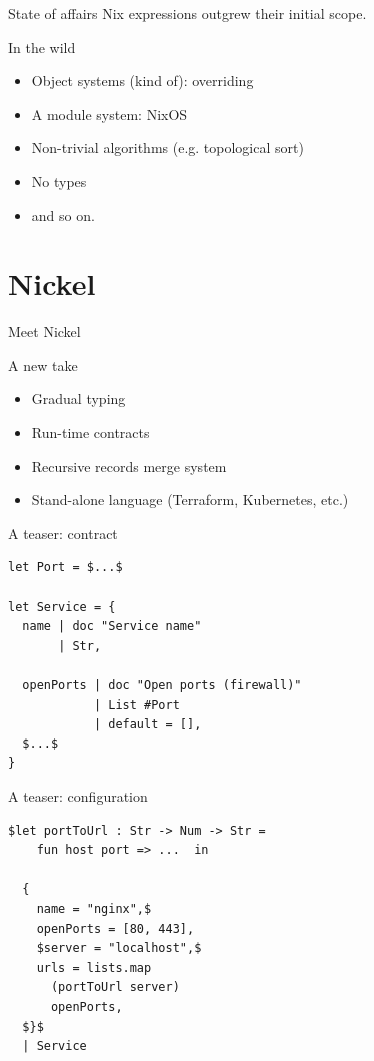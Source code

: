 \documentclass[a4paper]{beamer}
\begin{document}
\begin{frame}{State of affairs}
    Nix expressions outgrew their initial scope.

    \begin{exampleblock}{In the wild}
      \begin{itemize}
        \item Object systems (kind of): overriding
        \item A module system: NixOS
        \item Non-trivial algorithms (e.g. topological sort)
        \item No types
        \item and so on.
      \end{itemize}
    \end{exampleblock}
\end{frame}

\section{Nickel}

\begin{frame}{Meet Nickel}
    \begin{block}{A new take}
        \begin{itemize}
            \item Gradual typing
            \item Run-time contracts
            \item Recursive records merge system
            \item Stand-alone language (Terraform, Kubernetes, etc.)
        \end{itemize}
    \end{block}
\end{frame}

\begin{frame}[fragile]{A teaser: contract}
\begin{lstlisting}[language=Nickel,title={contracts.ncl}]
let Port = $...$

let Service = {
  name | doc "Service name"
       | Str,

  openPorts | doc "Open ports (firewall)"
            | List #Port
            | default = [],
  $...$
}
\end{lstlisting}
\end{frame}

\begin{frame}[fragile]{A teaser: configuration}
\begin{lstlisting}[language=Nickel,title={nginx.ncl}]
  $let portToUrl : Str -> Num -> Str =
    fun host port => ...  in

  {
    name = "nginx",$
    openPorts = [80, 443],
    $server = "localhost",$
    urls = lists.map
      (portToUrl server)
      openPorts,
  $}$
  | Service
\end{lstlisting}
\end{frame}
\end{document}
